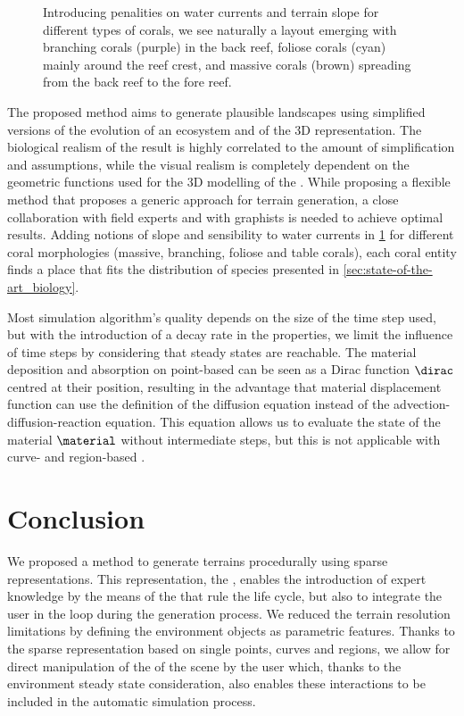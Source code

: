 \begin{figure}
    \caption{Introducing penalities on water currents and terrain slope for different types of corals, we see naturally a layout emerging with branching corals (purple) in the back reef, foliose corals (cyan) mainly around the reef crest, and massive corals (brown) spreading from the back reef to the fore reef. }
    \label{fig:env-obj-coral-layout}
\end{figure}

The proposed method aims to generate plausible landscapes using simplified versions of the evolution of an ecosystem and of the 3D representation. The biological realism of the result is highly correlated to the amount of simplification and assumptions, while the visual realism is completely dependent on the geometric functions used for the 3D modelling of the . While proposing a flexible method that proposes a generic approach for terrain generation, a close collaboration with field experts and with graphists is needed to achieve optimal results. Adding notions of slope and sensibility to water currents in \cref{fig:env-obj-coral-layout} for different coral morphologies (massive, branching, foliose and table corals), each coral entity finds a place that fits the distribution of species presented in \cref{sec:state-of-the-art_biology}. 

Most simulation algorithm's quality depends on the size of the time step used, but with the introduction of a decay rate in the  properties, we limit the influence of time steps by considering that steady states are reachable. The material deposition and absorption on point-based  can be seen as a Dirac function $\dirac$ centred at their position, resulting in the advantage that material displacement function can use the definition of the diffusion equation instead of the advection-diffusion-reaction equation. This equation allows us to evaluate the state of the material $\material$ without intermediate steps, but this is not applicable with curve- and region-based .


\section{Conclusion}
\label{sec:env-obj-conclusion}
We proposed a method to generate terrains procedurally using sparse representations. This representation, the , enables the introduction of expert knowledge by the means of the  that rule the  life cycle, but also to integrate the user in the loop during the generation process. We reduced the terrain resolution limitations by defining the environment objects as parametric features. Thanks to the sparse representation based on single points, curves and regions, we allow for direct manipulation of the  of the scene by the user which, thanks to the environment steady state consideration, also enables these interactions to be included in the automatic simulation process.

